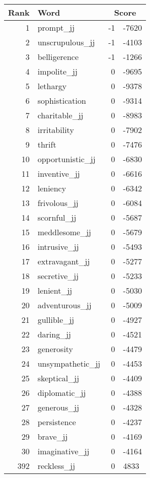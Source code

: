 \begin{longtable}[!htbp]{| rlr@{.}l |}
    \hline
    \textbf{Rank} & \textbf{Word} & \multicolumn{2}{c|}{\textbf{Score}} \\
    \hline
    \endhead
    1 & prompt\_jj & -1 & -7620 \\
    2 & unscrupulous\_jj & -1 & -4103 \\
    3 & belligerence & -1 & -1266 \\
    4 & impolite\_jj & 0 & -9695 \\
    5 & lethargy & 0 & -9378 \\
    6 & sophistication & 0 & -9314 \\
    7 & charitable\_jj & 0 & -8983 \\
    8 & irritability & 0 & -7902 \\
    9 & thrift & 0 & -7476 \\
    10 & opportunistic\_jj & 0 & -6830 \\
    11 & inventive\_jj & 0 & -6616 \\
    12 & leniency & 0 & -6342 \\
    13 & frivolous\_jj & 0 & -6084 \\
    14 & scornful\_jj & 0 & -5687 \\
    15 & meddlesome\_jj & 0 & -5679 \\
    16 & intrusive\_jj & 0 & -5493 \\
    17 & extravagant\_jj & 0 & -5277 \\
    18 & secretive\_jj & 0 & -5233 \\
    19 & lenient\_jj & 0 & -5030 \\
    20 & adventurous\_jj & 0 & -5009 \\
    21 & gullible\_jj & 0 & -4927 \\
    22 & daring\_jj & 0 & -4521 \\
    23 & generosity & 0 & -4479 \\
    24 & unsympathetic\_jj & 0 & -4453 \\
    25 & skeptical\_jj & 0 & -4409 \\
    26 & diplomatic\_jj & 0 & -4388 \\
    27 & generous\_jj & 0 & -4328 \\
    28 & persistence & 0 & -4237 \\
    29 & brave\_jj & 0 & -4169 \\
    30 & imaginative\_jj & 0 & -4164 \\
    392 & reckless\_jj & 0 & 4833 \\

\end{longtable}
